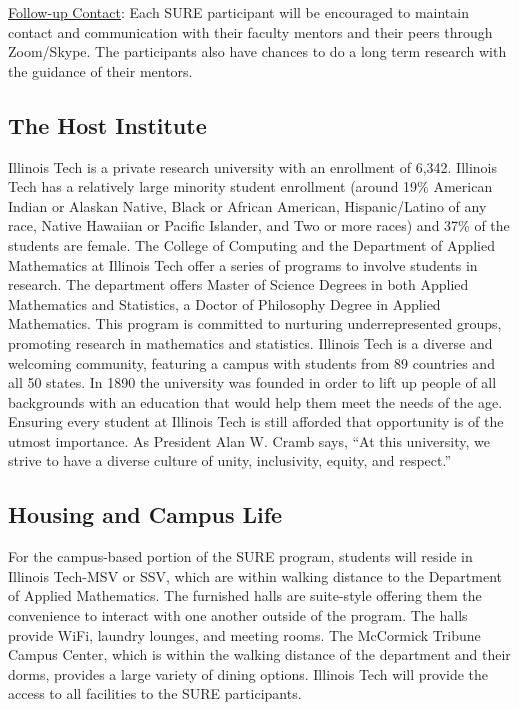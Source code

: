 \documentclass[11pt]{NSFamsart}
\newcommand{\Upara}[1]{\noindent\underline{\upshape #1}:}
\begin{document}
\Upara{Follow-up Contact} 
Each SURE participant will be encouraged to maintain contact and communication with their faculty mentors and their
peers through Zoom/Skype. The participants also have chances to do a long term research with the guidance of their mentors. 
 
\subsection{The Host Institute}
Illinois Tech is a private research university with an enrollment of 6,342. Illinois Tech has a relatively large minority student enrollment (around 19\% American Indian or Alaskan Native, Black or African American, Hispanic/Latino of any race, Native Hawaiian or Pacific Islander, and Two or more races) and 37\% of the students are female. The College of Computing
and the Department of Applied Mathematics at Illinois Tech offer a series of programs to involve students
in research. The department offers Master of Science Degrees
in both Applied Mathematics and Statistics, a Doctor of Philosophy Degree in Applied Mathematics.  This program is committed to nurturing underrepresented groups, promoting research in mathematics
and statistics. Illinois Tech is a diverse and welcoming community, featuring a campus with students from 89 countries and all 50 states. In 1890 the university was founded in order to lift up people of all backgrounds with an education that would help them meet the needs of the age. Ensuring every student at Illinois Tech is still afforded that opportunity is of the utmost importance.
As President Alan W. Cramb says, “At this university, we strive to have a diverse culture of unity, inclusivity, equity, and respect.” 

\subsection{Housing and Campus Life} For the campus-based portion of the SURE program, students
will reside in Illinois Tech-MSV or SSV, which are within walking distance
to the Department of Applied Mathematics. The furnished halls are suite-style offering them the
convenience to interact with one another outside of the program. The halls provide WiFi, laundry
lounges, and meeting rooms. The McCormick Tribune Campus Center, which is within the
walking distance of the department and their dorms, provides a large variety of dining options. Illinois Tech will provide the access to all facilities to the SURE participants. 
\end{document}
